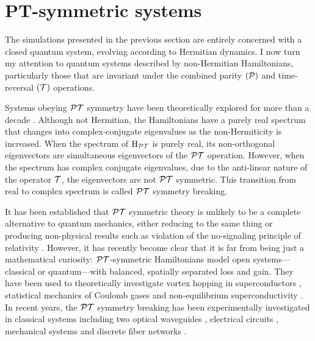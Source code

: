 
\section{PT-symmetric systems}
\label{sec:PT}
The simulations presented in the previous section are entirely concerned with a
closed quantum system, evolving according to Hermitian dynamics. I now turn my
attention to quantum systems described by non-Hermitian Hamiltonians,
particularly those that are invariant under the combined parity \((\mathcal{P})\) and
time-reversal \((\mathcal{T})\) operations.

Systems obeying \(\mathcal{PT}\) symmetry have been theoretically explored for more than
a decade \cite{bender98, levai-jphysa-33-7165, bender07}. Although not
Hermitian, the Hamiltonians have a purely real spectrum that changes into
complex-conjugate eigenvalues as the non-Hermiticity is increased. When the
spectrum of \(\mathrm{H}_{\mathcal{PT}{}}\) is purely real, its non-orthogonal
eigenvectors are simultaneous eigenvectors of the \(\mathcal{PT}{}\) operation. However,
when the spectrum has complex conjugate eigenvalues, due to the anti-linear
nature of the operator \(\mathcal{T}\), the eigenvectors are not \(\mathcal{PT}{}\)
symmetric. This transition from real to complex spectrum is called \(\mathcal{PT}{}\)
symmetry breaking. 

It has been established that \(\mathcal{PT}{}\) symmetric theory is unlikely to be a
complete alternative to quantum mechanics, either reducing to the same thing
\cite{mostafazadeh-jmathphys-43-205} or producing non-physical results such as
violation of the no-signaling principle of relativity \cite{lee-prl-112-130404}.
However, it has recently become clear that it is far from being just a
mathematical curiosity: \(\mathcal{PT}{}\)-symmetric Hamiltonians model open
systems---classical or quantum---with balanced, spatially separated loss and
gain. They have been used to theoretically investigate vortex hopping in
superconductors \cite{naomichi-physrevlett-77-570},
statistical mechanics of Coulomb gases \cite{gulden-jetp-117-517} and
non-equilibrium superconductivity \cite{rubinstein-physrevlett-99-167003,
serbyn-physrevb-87-020501}. In recent years, the \(\mathcal{PT}{}\)
symmetry breaking has been experimentally investigated in classical systems
including two optical waveguides \cite{pt-ruter}, electrical circuits
\cite{schindler-physreva-84-040101}, mechanical systems
\cite{bender-amjphys-81-173} and discrete fiber networks
\cite{pt-regensburger}.

